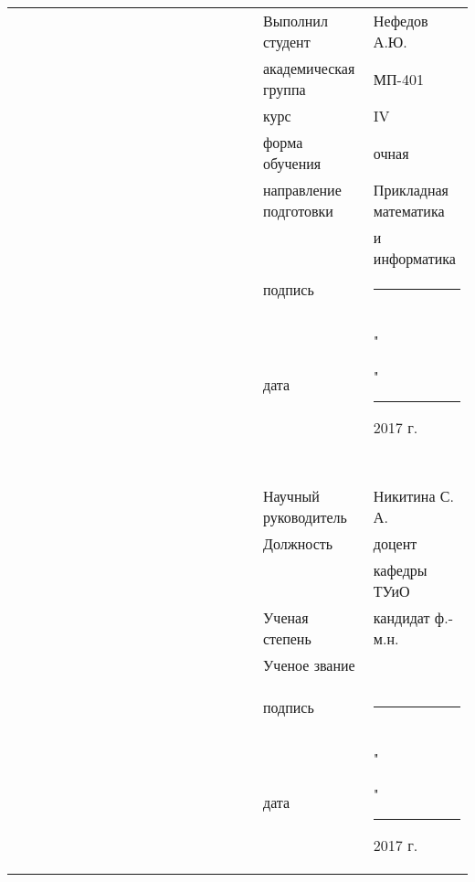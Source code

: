 \documentclass[12pt,a4paper,titlepage]{article}
\begin{document}
\begin{titlepage}
\begin{center}
{\footnotesize
\begin{tabular}[t]{lllllllllllllllllll}
& & & & & & & & & & & & & & & & &   Выполнил студент       &   Нефедов А.Ю.   \\
& & & & & & & & & & & & & & & & &   академическая группа   &   МП-401        \\
& & & & & & & & & & & & & & & & &   курс                   &   IV            \\
& & & & & & & & & & & & & & & & &   форма обучения         &   очная         \\
& & & & & & & & & & & & & & & & &   направление подготовки &   Прикладная математика    \\
& & & & & & & & & & & & & & & & &                          &    и информатика              \\
& & & & & & & & & & & & & & & & &   подпись                &   \rule{3.3cm}{0.01cm}\\
& & & & & & & & & & & & & & & & &                          &                 \\
& & & & & & & & & & & & & & & & &   дата                   &   "\rule{0,7cm}{0.01cm}"\rule{1cm}{0.01cm} 2017 г.\\
& & & & & & & & & & & & & & & & &                          &                 \\
& & & & & & & & & & & & & & & & &                          &                 \\
& & & & & & & & & & & & & & & & &                          &                 \\
& & & & & & & & & & & & & & & & &                          &                 \\
& & & & & & & & & & & & & & & & &                          &                 \\
& & & & & & & & & & & & & & & & &   Научный руководитель   &   Никитина С. А.\\
& & & & & & & & & & & & & & & & &   Должность              &   доцент     \\
& & & & & & & & & & & & & & & & &                          &   кафедры ТУиО  \\
& & & & & & & & & & & & & & & & &   Ученая степень         &   кандидат ф.-м.н.\\
& & & & & & & & & & & & & & & & &   Ученое звание          &                 \\
& & & & & & & & & & & & & & & & &                          &                 \\
& & & & & & & & & & & & & & & & &                          &                 \\
& & & & & & & & & & & & & & & & &   подпись                &  \rule{3.3cm}{0.01cm}\\
& & & & & & & & & & & & & & & & &                          &                 \\
& & & & & & & & & & & & & & & & &   дата                   &  "\rule{0,7cm}{0.01cm}"\rule{1cm}{0.01cm} 2017 г.     \\


\end{tabular}}
\end{center}
\end{titlepage}
\end{document}
